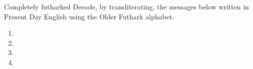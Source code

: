 \begin{exercises}{Completely futharked}\label{exercise-futhark}
Decode, by transliterating, the messages below written in Present Day English using the Older Futhark alphabet.

\begin{enumerate}
    \item {}
    \item {}
    \item {}
    \item {}
\end{enumerate}

\end{exercises}

